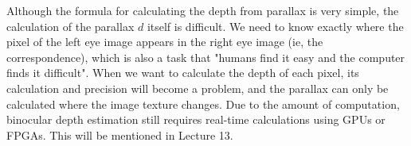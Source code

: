 Although the formula for calculating the depth from parallax is very simple, the calculation of the parallax $d$ itself is difficult. We need to know exactly where the pixel of the left eye image appears in the right eye image (ie, the correspondence), which is also a task that "humans find it easy and the computer finds it difficult". When we want to calculate the depth of each pixel, its calculation and precision will become a problem, and the parallax can only be calculated where the image texture changes. Due to the amount of computation, binocular depth estimation still requires real-time calculations using GPUs or FPGAs. This will be mentioned in Lecture 13.